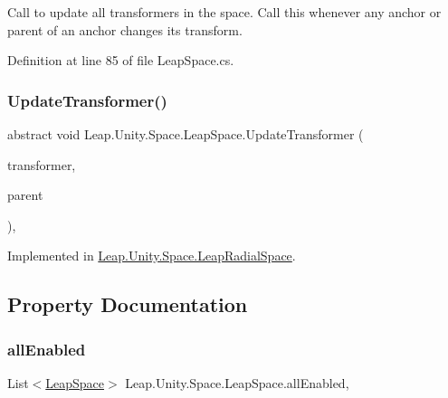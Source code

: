 Call to update all transformers in the space. Call this whenever any anchor or parent of an anchor changes it\textquotesingle{}s transform. 



Definition at line 85 of file Leap\+Space.\+cs.

\mbox{\label{class_leap_1_1_unity_1_1_space_1_1_leap_space_a37ecec9c078832e89a9b71b8455df62f}} 
\subsubsection{\texorpdfstring{UpdateTransformer()}{UpdateTransformer()}}
{\footnotesize\ttfamily abstract void Leap.\+Unity.\+Space.\+Leap\+Space.\+Update\+Transformer (\begin{DoxyParamCaption}\item[{\mbox{\hyperlink{interface_leap_1_1_unity_1_1_space_1_1_i_transformer}{I\+Transformer}}}]{transformer,  }\item[{\mbox{\hyperlink{interface_leap_1_1_unity_1_1_space_1_1_i_transformer}{I\+Transformer}}}]{parent }\end{DoxyParamCaption})\hspace{0.3cm}{\ttfamily [protected]}, {}}



Implemented in \mbox{\hyperlink{class_leap_1_1_unity_1_1_space_1_1_leap_radial_space_a9214f2211d8c755878962cc0a23e6168}{Leap.\+Unity.\+Space.\+Leap\+Radial\+Space}}.



\subsection{Property Documentation}
\mbox{\label{class_leap_1_1_unity_1_1_space_1_1_leap_space_abb31d6bf34c02c7b40fe0e34efad87cb}} 
\subsubsection{\texorpdfstring{allEnabled}{allEnabled}}
{\footnotesize\ttfamily List$<$\mbox{\hyperlink{class_leap_1_1_unity_1_1_space_1_1_leap_space}{Leap\+Space}}$>$ Leap.\+Unity.\+Space.\+Leap\+Space.\+all\+Enabled\hspace{0.3cm}{\ttfamily [static]}, {\ttfamily [get]}}



